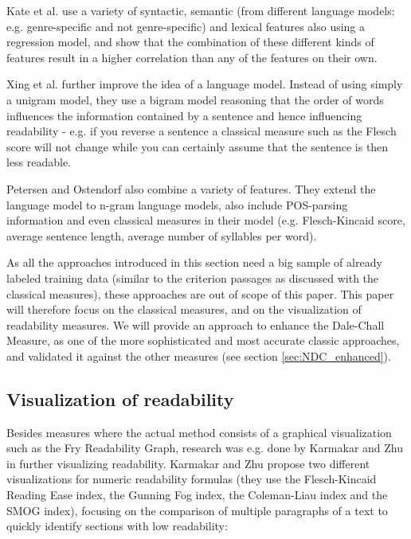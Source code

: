 \documentclass[runningheads,a4paper]{llncs}
\begin{document}
Kate et al. \cite{Kate2010} use a variety of syntactic, semantic (from different language models: e.g. genre-specific and not genre-specific) and lexical features also using a regression model, and show that the combination of these different kinds of features result in a higher correlation than any of the features on their own.

Xing et al. \cite{Xing2008} further improve the idea of a language model. Instead of using simply a unigram model, they use a bigram model reasoning that the order of words influences the information contained by a sentence and hence influencing readability - e.g. if you reverse a sentence a classical measure such as the Flesch score will not change while you can certainly assume that the sentence is then less readable.

Petersen and Ostendorf \cite{Petersen2006} also combine a variety of features. They extend the language model to n-gram language models, also include POS-parsing information and even classical measures in their model (e.g. Flesch-Kincaid score, average sentence length, average number of syllables per word).

As all the approaches introduced in this section need a big sample of already labeled training data (similar to the criterion passages as discussed with the classical measures), these approaches are out of scope of this paper. This paper will therefore focus on the classical measures, and on the visualization of readability measures. We will provide an approach to enhance the Dale-Chall Measure, as one of the more sophisticated and most accurate classic approaches, and validated it against the other measures (see section \ref{sec:NDC_enhanced}).

\subsection{Visualization of readability} \label{sec:visualization}

Besides measures where the actual method consists of a graphical  visualization such as the Fry Readability Graph, research was e.g. done by Karmakar  and Zhu \cite{Karmakar2010} \cite{Karmakar2010a} in further visualizing readability.
Karmakar and Zhu \cite{Karmakar2010a} propose two different visualizations for numeric readability formulas (they use the Flesch-Kincaid Reading Ease index, the Gunning Fog index, the Coleman-Liau index and the SMOG index), focusing on the comparison of multiple paragraphs of a text to quickly identify sections with low readability:
\end{document}
